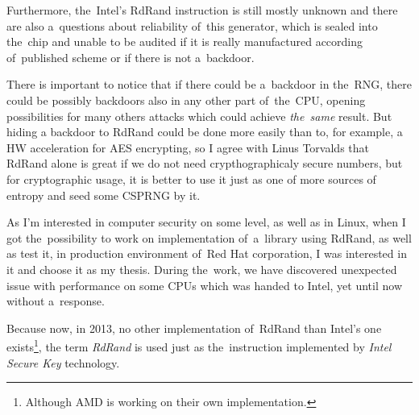 Furthermore, the~Intel's RdRand instruction is still mostly unknown and there are also a~questions about reliability of~this generator, which is sealed into the~chip and unable to be audited\cite{TheodoreTsoNSA} if it is really manufactured according of~published scheme\cite{AnalysisOfDRNG} or if there is not a~backdoor. 

There is important to notice that if there could be a~backdoor in the~RNG, there could be possibly backdoors also in any other part of~the~CPU, opening possibilities for many others attacks which could achieve {\em the~same} result. But hiding a backdoor to RdRand could be done more easily than to, for example, a HW acceleration for AES encrypting, so I agree with Linus Torvalds that RdRand alone is great if we do not need crypthographicaly secure numbers, but for cryptographic usage, it is better to use it just as one of more sources of entropy and seed some CSPRNG by it.

As I'm interested in computer security on some level, as well as in Linux, when I got the~possibility to work on implementation of~a~library using RdRand, as well as test it, in production environment of~Red Hat corporation, I was interested in it and choose it as my thesis. During the~work, we have discovered unexpected issue with performance on some CPUs which was handed to Intel, yet until now without a~response.

Because now, in 2013, no other implementation of~RdRand than Intel's one exists\footnote{Although AMD is working on their own implementation.},%
the term {\em RdRand} is used just as the~instruction implemented by {\em Intel Secure Key} technology.



